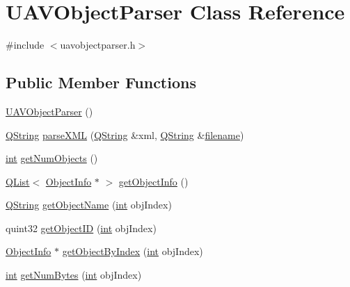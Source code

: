 \hypertarget{class_u_a_v_object_parser}{\section{U\-A\-V\-Object\-Parser Class Reference}
\label{class_u_a_v_object_parser}
}


{\ttfamily \#include $<$uavobjectparser.\-h$>$}

\subsection*{Public Member Functions}
\begin{DoxyCompactItemize}
\item 
\hyperlink{class_u_a_v_object_parser_af11956490a8d251e0b645f4e08420f3d}{U\-A\-V\-Object\-Parser} ()
\item 
\hyperlink{group___u_a_v_objects_plugin_gab9d252f49c333c94a72f97ce3105a32d}{Q\-String} \hyperlink{class_u_a_v_object_parser_a41d41d63f647f7ef236954ce35c034af}{parse\-X\-M\-L} (\hyperlink{group___u_a_v_objects_plugin_gab9d252f49c333c94a72f97ce3105a32d}{Q\-String} \&xml, \hyperlink{group___u_a_v_objects_plugin_gab9d252f49c333c94a72f97ce3105a32d}{Q\-String} \&\hyperlink{ioapi_8h_a7a03a664b090ce5c848ecb31cb4a2fa8}{filename})
\item 
\hyperlink{ioapi_8h_a787fa3cf048117ba7123753c1e74fcd6}{int} \hyperlink{class_u_a_v_object_parser_aa53f357ee6f96706e47c5fd296394537}{get\-Num\-Objects} ()
\item 
\hyperlink{class_q_list}{Q\-List}$<$ \hyperlink{struct_object_info}{Object\-Info} $\ast$ $>$ \hyperlink{class_u_a_v_object_parser_a4ea7d750facfba646916055fe3a64913}{get\-Object\-Info} ()
\item 
\hyperlink{group___u_a_v_objects_plugin_gab9d252f49c333c94a72f97ce3105a32d}{Q\-String} \hyperlink{class_u_a_v_object_parser_a26fb92663c18b4fba63f519f7c1981c9}{get\-Object\-Name} (\hyperlink{ioapi_8h_a787fa3cf048117ba7123753c1e74fcd6}{int} obj\-Index)
\item 
quint32 \hyperlink{class_u_a_v_object_parser_ae5eb01b3604a22bc2c5ad7b15885d431}{get\-Object\-I\-D} (\hyperlink{ioapi_8h_a787fa3cf048117ba7123753c1e74fcd6}{int} obj\-Index)
\item 
\hyperlink{struct_object_info}{Object\-Info} $\ast$ \hyperlink{class_u_a_v_object_parser_a5df30f3744d51bb1288a8f71f33dfe33}{get\-Object\-By\-Index} (\hyperlink{ioapi_8h_a787fa3cf048117ba7123753c1e74fcd6}{int} obj\-Index)
\item 
\hyperlink{ioapi_8h_a787fa3cf048117ba7123753c1e74fcd6}{int} \hyperlink{class_u_a_v_object_parser_adbc40700069770805200d6ceba8a5621}{get\-Num\-Bytes} (\hyperlink{ioapi_8h_a787fa3cf048117ba7123753c1e74fcd6}{int} obj\-Index)
\end{DoxyCompactItemize}
